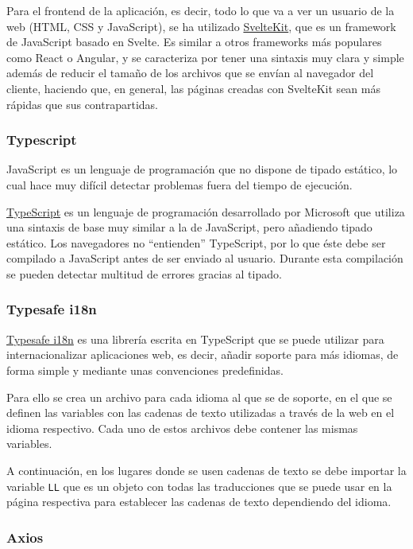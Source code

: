 Para el frontend de la aplicación, es decir, todo lo que va a ver un usuario de
la web (HTML, CSS y JavaScript), se ha utilizado
\href{https://kit.svelte.dev/}{SvelteKit}, que es un framework de JavaScript
basado en Svelte. Es similar a otros frameworks más populares como React o
Angular, y se caracteriza por tener una sintaxis muy clara y simple además de
reducir el tamaño de los archivos que se envían al navegador del cliente,
haciendo que, en general, las páginas creadas con SvelteKit sean más rápidas que
sus contrapartidas.

\subsubsection{Typescript}

JavaScript es un lenguaje de programación que no dispone de tipado estático, lo
cual hace muy difícil detectar problemas fuera del tiempo de ejecución.

\href{https://www.typescriptlang.org/}{TypeScript} es un lenguaje de
programación desarrollado por Microsoft que utiliza una sintaxis de base muy
similar a la de JavaScript, pero añadiendo tipado estático. Los navegadores no
``entienden'' TypeScript, por lo que éste debe ser compilado a JavaScript antes
de ser enviado al usuario. Durante esta compilación se pueden detectar multitud
de errores gracias al tipado.

\subsubsection{Typesafe i18n}

\href{https://github.com/ivanhofer/typesafe-i18n}{Typesafe i18n} es una librería
escrita en TypeScript que se puede utilizar para internacionalizar aplicaciones
web, es decir, añadir soporte para más idiomas, de forma simple y mediante unas
convenciones predefinidas.

Para ello se crea un archivo para cada idioma al que se de soporte, en el que se
definen las variables con las cadenas de texto utilizadas a través de la web en
el idioma respectivo. Cada uno de estos archivos debe contener las mismas
variables.

A continuación, en los lugares donde se usen cadenas de texto se debe importar la
variable \texttt{LL} que es un objeto con todas las traducciones que se puede
usar en la página respectiva para establecer las cadenas de texto dependiendo
del idioma.

\subsubsection{Axios}

